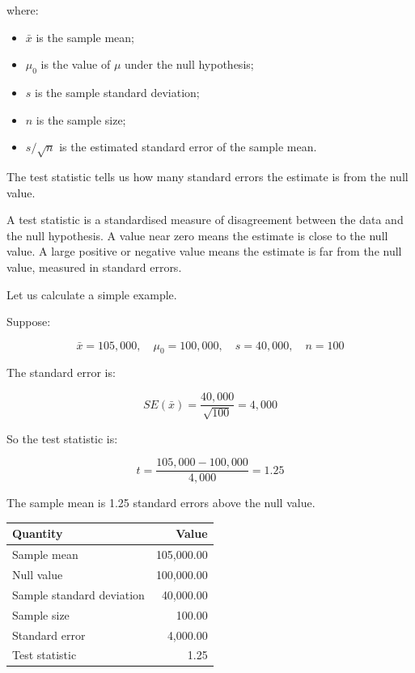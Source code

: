 \documentclass[
  letterpaper,
  DIV=11,
  numbers=noendperiod]{scrreprt}
\providecommand{\tightlist}{%
  \setlength{\itemsep}{0pt}\setlength{\parskip}{0pt}}
\begin{document}
where:

\begin{itemize}
\tightlist
\item
  \(\bar{x}\) is the sample mean;
\item
  \(\mu_0\) is the value of \(\mu\) under the null hypothesis;
\item
  \(s\) is the sample standard deviation;
\item
  \(n\) is the sample size;
\item
  \(s/\sqrt{n}\) is the estimated standard error of the sample mean.
\end{itemize}

The test statistic tells us how many standard errors the estimate is
from the null value.

\begin{tcolorbox}[enhanced jigsaw, arc=.35mm, bottomrule=.15mm, bottomtitle=1mm, breakable, colback=white, colbacktitle=quarto-callout-note-color!10!white, colframe=quarto-callout-note-color-frame, coltitle=black, left=2mm, leftrule=.75mm, opacityback=0, opacitybacktitle=0.6, rightrule=.15mm, title=\textcolor{quarto-callout-note-color}{\faInfo}\hspace{0.5em}{A test statistic in words}, titlerule=0mm, toprule=.15mm, toptitle=1mm]

A test statistic is a standardised measure of disagreement between the
data and the null hypothesis. A value near zero means the estimate is
close to the null value. A large positive or negative value means the
estimate is far from the null value, measured in standard errors.

\end{tcolorbox}

Let us calculate a simple example.

Suppose:

\[
\bar{x} = 105{,}000,
\quad
\mu_0 = 100{,}000,
\quad
s = 40{,}000,
\quad
n = 100
\]

The standard error is:

\[
SE(\bar{x}) = \frac{40{,}000}{\sqrt{100}} = 4{,}000
\]

So the test statistic is:

\[
t
=
\frac{105{,}000 - 100{,}000}{4{,}000}
=
1.25
\]

The sample mean is 1.25 standard errors above the null value.

\begin{table}
\fontsize{12.0pt}{14.0pt}\selectfont
\begin{tabular*}{\linewidth}{@{\extracolsep{\fill}}lr}
\toprule
Quantity & Value \\ 
\midrule\addlinespace[2.5pt]
Sample mean & 105,000.00 \\ 
Null value & 100,000.00 \\ 
Sample standard deviation & 40,000.00 \\ 
Sample size & 100.00 \\ 
Standard error & 4,000.00 \\ 
Test statistic & 1.25 \\ 
\bottomrule
\end{tabular*}
\end{table}
\end{document}
